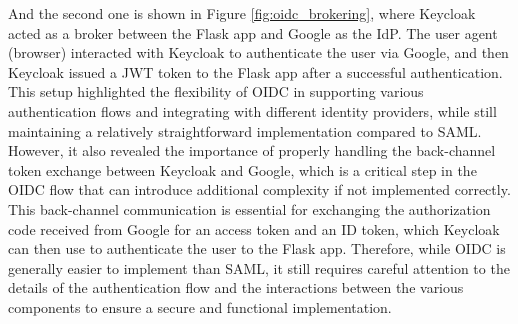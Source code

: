 \documentclass[../memoire.tex]{subfiles}
\begin{document}
And the second one is shown in Figure \ref{fig:oidc_brokering}, where Keycloak acted as a broker between the Flask app and Google as the IdP. The user agent (browser) interacted with Keycloak to authenticate the user via Google, and then Keycloak issued a JWT token to the Flask app after a successful authentication. This setup highlighted the flexibility of OIDC in supporting various authentication flows and integrating with different identity providers, while still maintaining a relatively straightforward implementation compared to SAML. However, it also revealed the importance of properly handling the back-channel token exchange between Keycloak and Google, which is a critical step in the OIDC flow that can introduce additional complexity if not implemented correctly. This back-channel communication is essential for exchanging the authorization code received from Google for an access token and an ID token, which Keycloak can then use to authenticate the user to the Flask app. Therefore, while OIDC is generally easier to implement than SAML, it still requires careful attention to the details of the authentication flow and the interactions between the various components to ensure a secure and functional implementation.
\end{document}
